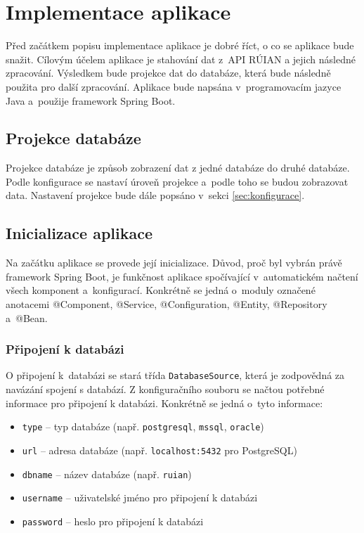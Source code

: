 \chapter{Implementace aplikace}
Před začátkem popisu implementace aplikace je dobré říct, o co se aplikace bude snažit.
Cílovým účelem aplikace je stahování dat z~API RÚIAN a jejich následné zpracování.
Výsledkem bude projekce dat do databáze, která bude následně použita pro další zpracování.
Aplikace bude napsána v~programovacím jazyce Java a~použije framework Spring Boot.

\section{Projekce databáze}
Projekce databáze je způsob zobrazení dat z jedné databáze do druhé databáze.
Podle konfigurace se nastaví úroveň projekce a~podle toho se budou zobrazovat data.
Nastavení projekce bude dále popsáno v~sekci \ref{sec:konfigurace}.

\section{Inicializace aplikace}
Na začátku aplikace se provede její inicializace.
Důvod, proč byl vybrán právě framework Spring Boot, je funkčnost aplikace spočívající v~automatickém načtení všech komponent a~konfigurací.
Konkrétně se jedná o~moduly označené anotacemi @Component, @Service, @Configuration, @Entity, @Repository a~@Bean.

\subsection{Připojení k databázi}
O připojení k~databázi se stará třída \texttt{DatabaseSource}, která je zodpovědná za navázání spojení s databází.
Z konfiguračního souboru se načtou potřebné informace pro připojení k databázi.
Konkrétně se jedná o~tyto informace:
\begin{itemize}
    \item \texttt{type} -- typ databáze (např. \texttt{postgresql}, \texttt{mssql}, \texttt{oracle})
    \item \texttt{url} -- adresa databáze (např. \texttt{localhost:5432} pro PostgreSQL)
    \item \texttt{dbname} -- název databáze (např. \texttt{ruian})
    \item \texttt{username} -- uživatelské jméno pro připojení k databázi
    \item \texttt{password} -- heslo pro připojení k databázi
\end{itemize}

